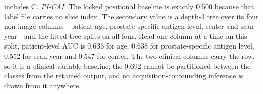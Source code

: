 \documentclass[11pt,letterpaper]{article}
\begin{document}
\begin{singlespace}
{includes C.
\emph{PI-CAI.} The locked positional baseline is exactly 0.500 because that label
file carries no slice index. The secondary value is a depth-3 tree over its four
non-image columns---patient age, prostate-specific antigen level, center and scan
year---and the fitted tree splits on all four. Read one column at a time on this
split, patient-level AUC is 0.636 for age, 0.638 for prostate-specific antigen
level, 0.552 for scan year and 0.547 for center. The two clinical columns carry
the row, so it is a clinical-variable baseline; the 0.692 cannot be partitioned
between the classes from the retained output, and no acquisition-confounding
inference is drawn from it anywhere.

}

\end{singlespace}
\end{document}
